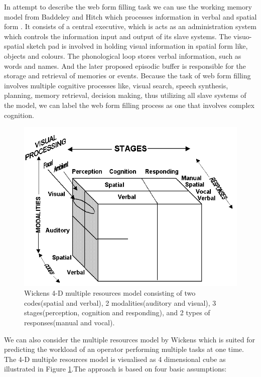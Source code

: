 \documentclass[a4paper]{report}
\begin{document}
			In attempt to describe the web form filling task we can use the working memory model from Baddeley and Hitch \cite{baddeley1974working} which processes information in verbal and spatial form . It consists of a central executive, which is acts as an administration system which controls the information input and output of its slave systems. The visuo-spatial sketch pad is involved in holding visual information in spatial form like, objects and colours. The phonological loop stores verbal information, such as words and names. 			And the later proposed \cite{baddeley2000episodic} episodic buffer is responsible for the storage and retrieval of memories or events. Because the task of web form filling involves multiple cognitive processes like, visual search, speech synthesis, planning, memory retrieval, decision making, thus utilizing all slave systems of the model, we can label the web form filling process as one that involves complex cognition. 		
			\begin{figure}[h]
				\centering
				\includegraphics[width=0.8\linewidth]{mrt}
				\caption[Multiple resource theory by Wickens]{Wickens 4-D multiple resources model consisting of two codes(spatial and verbal), 2 modalities(auditory and visual), 3 stages(perception, cognition and responding), and 2 types of responses(manual and vocal).}
				\label{fig:mrt}
			\end{figure}
			We can also consider the multiple resources model by Wickens\cite{wickens2008multiple,wickens2002multiple} which is suited for predicting the workload of an operator performing multiple tasks at one time. The 4-D multiple resources model is visualised as 4 dimensional cube as illustrated in Figure \ref{fig:mrt}.The approach is based on four basic assumptions:
\end{document}
